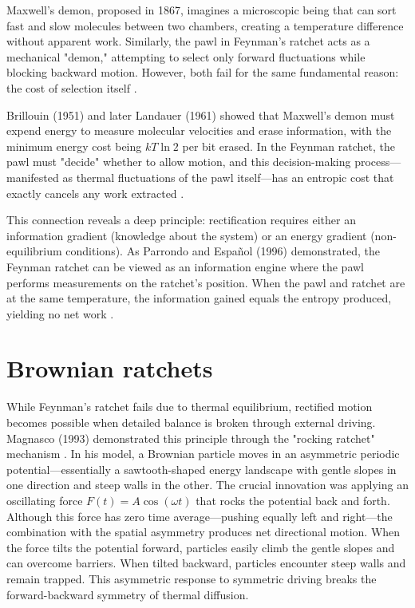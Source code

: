 Maxwell's demon, proposed in 1867, imagines a microscopic being that can sort fast and slow molecules between two chambers, creating a temperature difference without apparent work. Similarly, the pawl in Feynman's ratchet acts as a mechanical "demon," attempting to select only forward fluctuations while blocking backward motion. However, both fail for the same fundamental reason: the cost of selection itself \cite{maxwell1871theory, maxwell1867letter}.

Brillouin (1951) and later Landauer (1961) showed that Maxwell's demon must expend energy to measure molecular velocities and erase information, with the minimum energy cost being $kT\ln{2}$ per bit erased. In the Feynman ratchet, the pawl must "decide" whether to allow motion, and this decision-making process—manifested as thermal fluctuations of the pawl itself—has an entropic cost that exactly cancels any work extracted \cite{brillouin1951maxwell, landauer1961irreversibility}.

This connection reveals a deep principle: rectification requires either an information gradient (knowledge about the system) or an energy gradient (non-equilibrium conditions). As Parrondo and Español (1996) demonstrated, the Feynman ratchet can be viewed as an information engine where the pawl performs measurements on the ratchet's position. When the pawl and ratchet are at the same temperature, the information gained equals the entropy produced, yielding no net work \cite{parrondo1996criticism}.


\section{Brownian ratchets}

While Feynman's ratchet fails due to thermal equilibrium, rectified motion becomes possible when detailed balance is broken through external driving. Magnasco (1993) demonstrated this principle through the "rocking ratchet" mechanism \cite{magnasco1993forced}. In his model, a Brownian particle moves in an asymmetric periodic potential—essentially a sawtooth-shaped energy landscape with gentle slopes in one direction and steep walls in the other.
The crucial innovation was applying an oscillating force $F(t) = A\cos(\omega t)$ that rocks the potential back and forth. Although this force has zero time average—pushing equally left and right—the combination with the spatial asymmetry produces net directional motion. When the force tilts the potential forward, particles easily climb the gentle slopes and can overcome barriers. When tilted backward, particles encounter steep walls and remain trapped. This asymmetric response to symmetric driving breaks the forward-backward symmetry of thermal diffusion.

